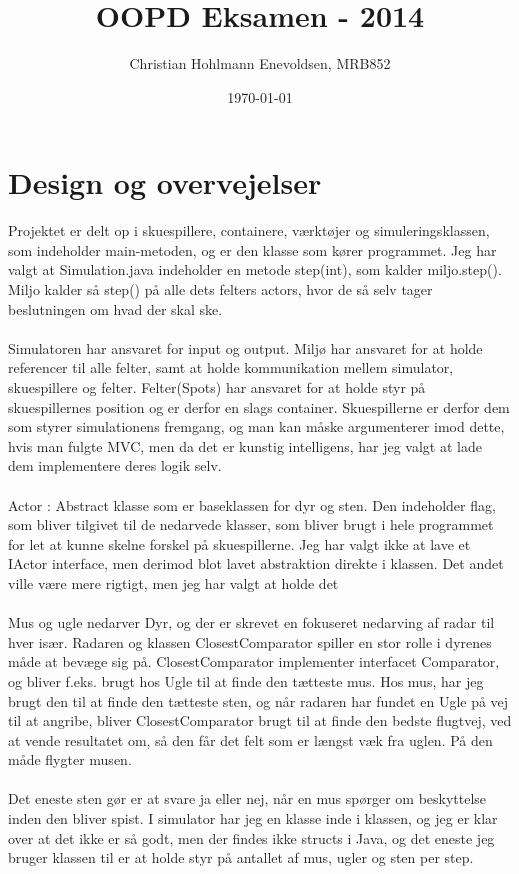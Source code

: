 \documentclass[]{article}
\begin{document}
\title{OOPD Eksamen - 2014}
\author{Christian Hohlmann Enevoldsen, MRB852}
\date{\today}
\maketitle

\section{Design og overvejelser}

Projektet er delt op i skuespillere, containere, værktøjer og simuleringsklassen, som indeholder main-metoden, og er den klasse som kører programmet.
Jeg har valgt at Simulation.java indeholder en metode step(int), som kalder miljo.step(). Miljo kalder så step() på alle dets felters actors, hvor de så selv tager beslutningen om hvad der skal ske. 
\\\\
Simulatoren har ansvaret for input og output. Miljø har ansvaret for at holde referencer til alle felter, samt at holde kommunikation mellem simulator, skuespillere og felter. Felter(Spots) har ansvaret for at holde styr på skuespillernes position og er derfor en slags container. Skuespillerne er derfor dem som styrer simulationens fremgang, og man kan måske argumenterer imod dette, hvis man fulgte MVC, men da det er kunstig intelligens, har jeg valgt at lade dem implementere deres logik selv.
\\\\
Actor : Abstract klasse som er baseklassen for dyr og sten. Den indeholder flag, som bliver tilgivet til de nedarvede klasser, som bliver brugt i hele programmet for let at kunne skelne forskel på skuespillerne. Jeg har valgt ikke at lave et IActor interface, men derimod blot lavet abstraktion direkte i klassen. Det andet ville være mere rigtigt, men jeg har valgt at holde det 
\\\\
Mus og ugle nedarver Dyr, og der er skrevet en fokuseret nedarving af radar til hver især. Radaren og klassen ClosestComparator spiller en stor rolle i dyrenes måde at bevæge sig på. ClosestComparator implementer interfacet Comparator, og bliver f.eks. brugt hos Ugle til at finde den tætteste mus. Hos mus, har jeg brugt den til at finde den tætteste sten, og når radaren har fundet en Ugle på vej til at angribe, bliver ClosestComparator brugt til at finde den bedste flugtvej, ved at vende resultatet om, så den får det felt som er længst væk fra uglen. På den måde flygter musen. 
\\\\
Det eneste sten gør er at svare ja eller nej, når en mus spørger om beskyttelse inden den bliver spist. 
I simulator har jeg en klasse inde i klassen, og jeg er klar over at det ikke er så godt, men der findes ikke structs i Java, og det eneste jeg bruger klassen til er at holde styr på antallet af mus, ugler og sten per step.
\end{document}
